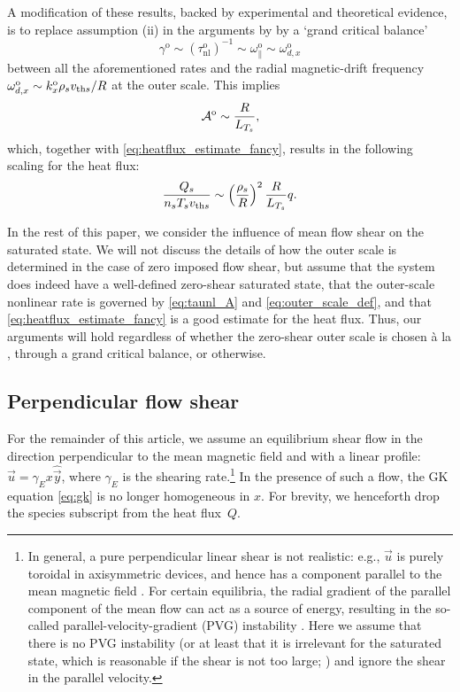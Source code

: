 \documentclass{jpp}
\newcommand{\taunlo}{\tau_\text{nl}^\text{o}}
\newcommand{\kxo}{k_x^\text{o}}
\newcommand{\gammao}{\gamma^\text{o}}
\newcommand{\gammaE}{\gamma_{E}}
\newcommand{\A}{\mathcal{A}}
\newcommand{\Ao}{\A^\text{o}}
\begin{document}
A modification of these results, backed by experimental \citep{ghim13} and theoretical \citep{nies24} evidence, is to replace assumption (ii) in the arguments by \citet{barnes11} by a `grand critical balance'
\begin{equation}
	\gammao \sim (\taunlo)^{-1} \sim \omega_\parallel^\text{o} \sim \omega^\text{o}_{d,x}
	\label{eq:grand_CB}
\end{equation}
between all the aforementioned rates and the radial magnetic-drift frequency \mbox{\(\omega^\text{o}_{d,x} \sim \kxo \rho_\s \vths/R\)} at the outer scale. This implies
\begin{equation}
	\Ao \sim \frac{R}{L_{T_\s}},
	\label{eq:A_grandcritbal}
\end{equation}
which, together with \cref{eq:heatflux_estimate_fancy}, results in the following scaling for the heat flux:
\begin{equation}
	\frac{Q_s}{n_{s} T_{s} v_{\text{th}s}} \sim \left(\frac{\rho_s}{R}\right)^2 \frac{R}{L_{T_s}} q.
\end{equation}

In the rest of this paper, we consider the influence of mean flow shear on the saturated state. We will not discuss the details of how the outer scale is determined in the case of zero imposed flow shear, but assume that the system does indeed have a well-defined zero-shear saturated state, that the outer-scale nonlinear rate is governed by \cref{eq:taunl_A} and \cref{eq:outer_scale_def}, and that \cref{eq:heatflux_estimate_fancy} is a good estimate for the heat flux. Thus, our arguments will hold regardless of whether the zero-shear outer scale is chosen \`a la \citet{barnes11}, through a grand critical balance, or otherwise.


\subsection{Perpendicular flow shear}
\label{sec:flow_shear}


For the remainder of this article, we assume an equilibrium shear flow in the direction perpendicular to the mean magnetic field and with a linear profile: \mbox{\(\vec{u} = \gammaE x \hat{\vec{y}}\)}, where \(\gammaE\) is the shearing rate.\footnote{\label{footnote:pvg}In general, a pure perpendicular linear shear is not realistic: e.g., \(\vec{u}\) is purely toroidal in axisymmetric devices, and hence has a component parallel to the mean magnetic field \citep{abel13}. For certain equilibria, the radial gradient of the parallel component of the mean flow can act as a source of energy, resulting in the so-called parallel-velocity-gradient (PVG) instability \citep{catto73,newton10,sch12}. Here we assume that there is no PVG instability (or at least that it is irrelevant for the saturated state, which is reasonable if the shear is not too large; \citealt{highcock10,barnes11}) and ignore the shear in the parallel velocity.} In the presence of such a flow, the GK equation \cref{eq:gk} is no longer homogeneous in \(x\). For brevity, we henceforth drop the species subscript from the heat flux~\(Q\).
\end{document}
